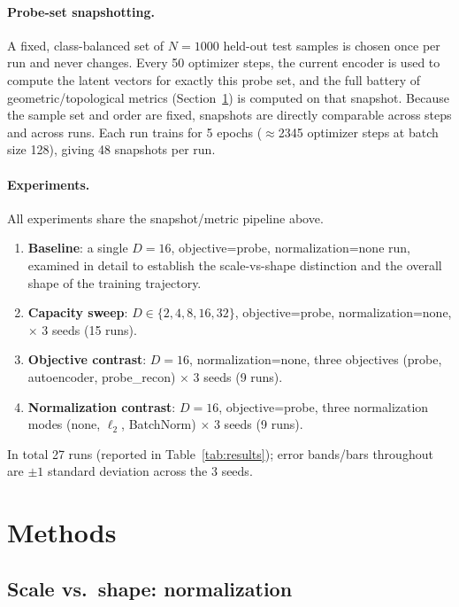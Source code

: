 \documentclass[11pt]{article}
\begin{document}
\paragraph{Probe-set snapshotting.} A fixed, class-balanced set of $N{=}1000$
held-out test samples is chosen once per run and never changes. Every 50
optimizer steps, the current encoder is used to compute the latent vectors
for exactly this probe set, and the full battery of geometric/topological
metrics (Section~\ref{sec:methods}) is computed on that snapshot. Because the
sample set and order are fixed, snapshots are directly comparable across
steps and across runs. Each run trains for 5 epochs ($\approx$2345 optimizer
steps at batch size 128), giving 48 snapshots per run.

\paragraph{Experiments.} All experiments share the snapshot/metric pipeline
above.
\begin{enumerate}
  \item \textbf{Baseline}: a single $D{=}16$, objective=probe,
        normalization=none run, examined in detail to establish the
        scale-vs-shape distinction and the overall shape of the training
        trajectory.
  \item \textbf{Capacity sweep}: $D \in \{2,4,8,16,32\}$, objective=probe,
        normalization=none, $\times$ 3 seeds (15 runs).
  \item \textbf{Objective contrast}: $D{=}16$, normalization=none, three
        objectives (probe, autoencoder, probe\_recon) $\times$ 3 seeds
        (9 runs).
  \item \textbf{Normalization contrast}: $D{=}16$, objective=probe, three
        normalization modes (none, $\ell_2$, BatchNorm) $\times$ 3 seeds
        (9 runs).
\end{enumerate}
In total 27 runs (reported in Table~\ref{tab:results}); error bands/bars
throughout are $\pm 1$ standard deviation across the 3 seeds.

\section{Methods}
\label{sec:methods}

\subsection{Scale vs.\ shape: normalization}
\end{document}
